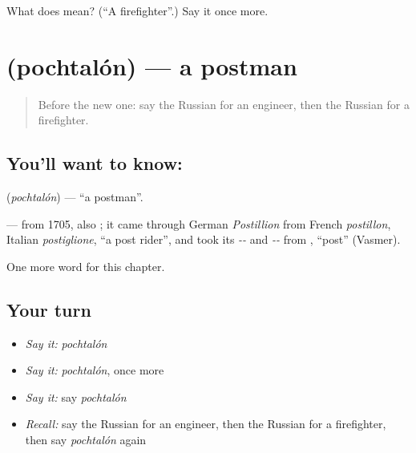 \begin{tcolorbox}[breakable,colback=teal!4,colframe=teal!35!black,title={Before you move on}]
What does  mean? (\textquotedblleft{}A firefighter\textquotedblright{}.) Say it once more.
\end{tcolorbox}
\section[\texorpdfstring{\ru{почтальон} (pochtalón)}{почтальон (pochtalón)}]{ (pochtalón) — a postman}

\label{lesson:RU-C109-postman}



\begin{quote}
Before the new one: say the Russian for an engineer, then the Russian for a firefighter.
\end{quote}

\subsection*{You'll want to know: }
\textbf{} (\emph{pochtalón}) — \textquotedblleft{}a postman\textquotedblright{}.

\begin{cousinweb}
\textbf{} — from 1705, also \emph{}; it came through German \emph{Postillion} from French \emph{postillon}, Italian \emph{postiglione}, \textquotedblleft{}a post rider\textquotedblright{}, and took its \emph{--} and \emph{--} from \emph{}, \textquotedblleft{}post\textquotedblright{} (Vasmer).
\end{cousinweb}

\begin{grammarlens}[title={What you've built}]
One more word for this chapter.
\end{grammarlens}

\subsection*{Your turn}
\begin{itemize}
\raggedright
  \item \emph{Say it:} \emph{pochtalón}
  \item \emph{Say it:} \emph{pochtalón}, once more
  \item \emph{Say it:} say \emph{pochtalón}
  \item \emph{Recall:} say the Russian for an engineer, then the Russian for a firefighter, then say \emph{pochtalón} again
\end{itemize}

